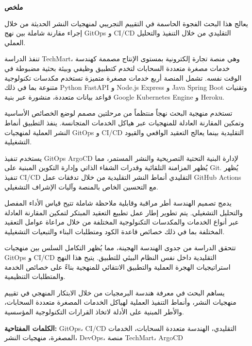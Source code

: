 \thispagestyle{empty}

\begin{center}
{\Large \textbf{\textarabic{ملخص}}}
\end{center}

\vspace{1cm}

\begin{otherlanguage}{arabic}
\begin{RTL}

يعالج هذا البحث الفجوة الحاسمة في التقييم التجريبي لمنهجيات النشر الحديثة من خلال إجراء مقارنة شاملة بين نهج GitOps و CI/CD التقليدي من خلال التنفيذ والتحليل العملي.

تنفذ الدراسة TechMart، وهي منصة تجارة إلكترونية بمستوى الإنتاج مصممة كهندسة خدمات مصغرة متعددة السحابات لتخدم كتطبيق وظيفي وبيئة بحثية مضبوطة في الوقت نفسه. تشمل المنصة أربع خدمات مصغرة متميزة تستخدم مكدسات تكنولوجية متنوعة بما في ذلك Python FastAPI و Node.js Express و Java Spring Boot وتقنيات قواعد بيانات متعددة، منشورة عبر بنية Google Kubernetes Engine و Heroku.

تستخدم منهجية البحث نهجاً منتظماً من مرحلتين مصمم لوضع الخصائص الأساسية وتمكين المقارنة العادلة للمنهجيات عبر هياكل الخدمات المتجانسة. ينفذ التطبيق أنماط النشر العملية لمنهجيات GitOps و CI/CD التقليدية بينما يعالج التعقيد الواقعي والقيود التشغيلية.

يستخدم تنفيذ GitOps ArgoCD لإدارة البنية التحتية التصريحية والنشر المستمر، مما يُظهر المزامنة التلقائية وقدرات الشفاء الذاتي وإدارة التكوين المبنية على Git. يُظهر تنفيذ CI/CD التقليدي أنماط النشر التقليدية من خلال تدفقات عمل GitHub Actions مع التحسين الخاص بالمنصة وآليات الإشراف التشغيلي.

يدمج تصميم الهندسة أطر مراقبة وقابلية ملاحظة شاملة تتيح قياس الأداء المفصل والتحليل التشغيلي. يتم تطوير إطار عمل تطبيع التعقيد المبتكر لتمكين المقارنة العادلة عبر أنواع الخدمات والمكدسات التكنولوجية المختلفة من خلال مراعاة عوامل التعقيد المختلفة بما في ذلك خصائص قاعدة الكود ومتطلبات البناء والتبعيات التشغيلية.

تتحقق الدراسة من جدوى الهندسة الهجينة، مما يُظهر التكامل السلس بين منهجيات GitOps و CI/CD التقليدية داخل نفس النظام البيئي للتطبيق. يتيح هذا النهج استراتيجيات الهجرة العملية والتطبيق الانتقائي للمنهجية بناءً على خصائص الخدمة والمتطلبات التنظيمية.

يساهم البحث في معرفة هندسة البرمجيات من خلال الابتكار المنهجي في تقييم منهجيات النشر، وأنماط التنفيذ العملية لهياكل الخدمات المصغرة متعددة السحابات، والأطر المبنية على الأدلة لاتخاذ القرارات التكنولوجية المؤسسية.

\textbf{الكلمات المفتاحية:} GitOps، CI/CD التقليدي، الهندسة متعددة السحابات، الخدمات المصغرة، منهجيات النشر، DevOps، منصة TechMart، ArgoCD

\end{RTL}
\end{otherlanguage}

\newpage